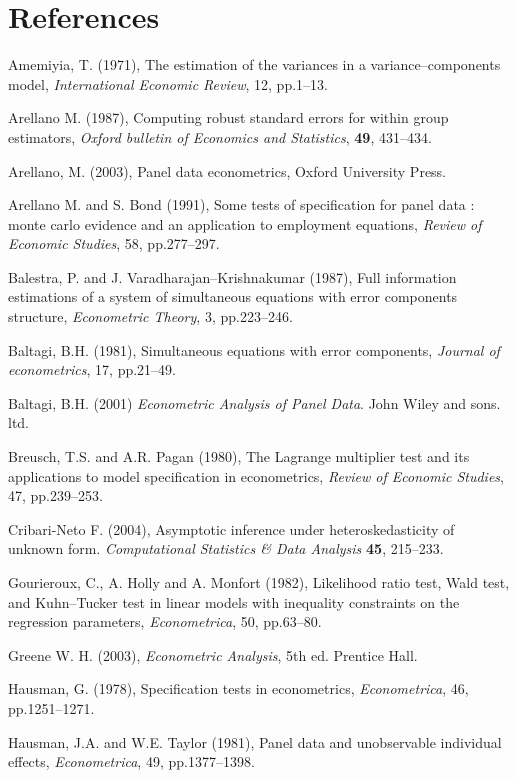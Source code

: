 \documentclass[a4paper]{article}
\begin{document}
\section{References}

\setlength{\parindent}{0em}
\setlength{\parskip}{0.4cm}

  Amemiyia, T. (1971), The estimation of the variances in a
  variance--components model, \emph{International Economic Review}, 12,
  pp.1--13.

  Arellano M. (1987), Computing robust standard errors for within group estimators, 
\emph{Oxford bulletin of Economics and Statistics}, \textbf{49}, 431--434.


  Arellano, M. (2003), Panel data econometrics, Oxford University Press.

  Arellano M. and S. Bond (1991), Some tests of specification for
  panel data : monte carlo evidence and an application to employment
  equations, \emph{Review of Economic Studies}, 58, pp.277--297.

  Balestra, P. and J. Varadharajan--Krishnakumar (1987), Full
  information estimations of a system of simultaneous equations with
  error components structure, \emph{Econometric Theory}, 3, pp.223--246.
  
  Baltagi, B.H. (1981), Simultaneous equations with error components,
  \emph{Journal of econometrics}, 17, pp.21--49.
  
  Baltagi, B.H. (2001) \emph{Econometric Analysis of Panel Data}. John
  Wiley and sons. ltd.

  Breusch, T.S. and A.R. Pagan (1980), The Lagrange multiplier test and
  its applications to model specification in econometrics, \emph{Review
    of Economic Studies}, 47, pp.239--253.

  Cribari-Neto F. (2004), Asymptotic inference under heteroskedasticity
of unknown form. \emph{Computational Statistics \& Data Analysis}
\textbf{45}, 215--233.

  Gourieroux, C., A. Holly and A. Monfort (1982), Likelihood ratio test,
  Wald test, and Kuhn--Tucker test in linear models with inequality
  constraints on the regression parameters, \emph{Econometrica}, 50,
  pp.63--80.

  Greene W. H. (2003), \emph{Econometric Analysis}, 5th ed. Prentice Hall.

  Hausman, G. (1978), Specification tests in econometrics,
  \emph{Econometrica}, 46, pp.1251--1271.

  Hausman, J.A. and W.E. Taylor (1981), Panel data and unobservable
  individual effects, \emph{Econometrica}, 49, pp.1377--1398.
  
\end{document}
